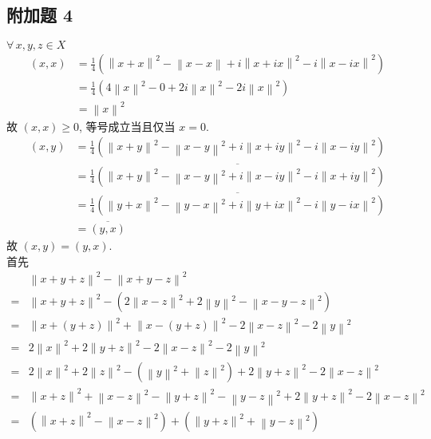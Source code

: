 \documentclass[../main.tex]{subfiles}
\begin{document}
\subsection{附加题 4}
$\forall \, x, y, z \in X$
\begin{align*}
    \left( x, x \right)
    &= \frac{1}{4} \left( \left\| x + x \right\|^2 - \left\| x - x \right\| + i \left\| x + i x \right\|^2 - i \left\| x - i x \right\|^2 \right) \\
    &= \frac{1}{4} \left( 4 \left\| x \right\|^2 - 0 + 2 i \left\| x \right\|^2 - 2 i \left\| x \right\|^2 \right) \\
    &= \left\| x \right\|^2
\end{align*}
故 $\left( x, x \right) \geqslant 0$, 等号成立当且仅当 $x = 0$.
\begin{align*}
    \left( x, y \right)
    &= \frac{1}{4} \left( \left\| x + y \right\|^2 - \left\| x - y \right\|^2 + i \left\| x + i y \right\|^2 - i \left\| x - i y \right\|^2 \right) \\
    &= \overline{\frac{1}{4} \left( \left\| x + y \right\|^2 - \left\| x - y \right\|^2 + i \left\| x - i y \right\|^2 - i \left\| x + i y \right\|^2 \right)} \\
    &= \overline{\frac{1}{4} \left( \left\| y + x \right\|^2 - \left\| y - x \right\|^2 + i \left\| y + i x \right\|^2 - i \left\| y - i x \right\|^2 \right)} \\
    &= \overline{\left( y, x \right)}
\end{align*}
故 $\left( x, y \right) = \left( y, x \right)$. \\
首先
\begin{align*}
    & \left\| x + y + z \right\|^2 - \left\| x + y - z \right\|^2 \\
    =& \left\| x + y + z \right\|^2 - \left( 2 \left\| x - z \right\|^2 + 2 \left\| y \right\|^2 - \left\| x - y - z \right\|^2 \right) \\
    =& \left\| x + \left( y + z \right) \right\|^2 + \left\| x - \left( y + z \right) \right\|^2 - 2 \left\| x - z \right\|^2 - 2 \left\| y \right\|^2 \\
    =& 2 \left\| x \right\|^2 + 2 \left\| y + z \right\|^2 - 2 \left\| x - z \right\|^2 - 2 \left\| y \right\|^2 \\
    =& 2 \left\| x \right\|^2 + 2 \left\| z \right\|^2 - \left( \left\| y \right\|^2 + \left\| z \right\|^2 \right) + 2 \left\| y + z \right\|^2 - 2 \left\| x - z \right\|^2 \\
    =& \left\| x + z \right\|^2 + \left\| x - z \right\|^2 - \left\| y + z \right\|^2 - \left\| y - z \right\|^2 + 2 \left\| y + z \right\|^2 - 2 \left\| x - z \right\|^2 \\
    =& \left( \left\| x + z \right\|^2 - \left\| x - z \right\|^2 \right) + \left( \left\| y + z \right\|^2 + \left\| y - z \right\|^2 \right)
\end{align*}
\end{document}
